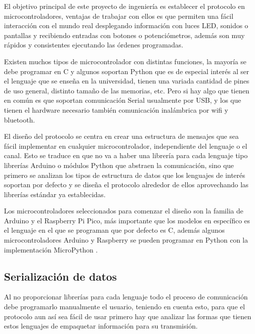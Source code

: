 El objetivo principal de este proyecto de ingeniería es establecer el protocolo en microcontroladores, ventajas de trabajar con ellos es que permiten una fácil interacción con el mundo real desplegando información con luces LED, sonidos o pantallas y recibiendo entradas con botones o potenciómetros, además son muy rápidos y consistentes ejecutando las órdenes programadas.

Existen muchos tipos de microcontrolador con distintas funciones, la mayoría se debe programar en C y algunos soportan Python que es de especial interés al ser el lenguaje que se enseña en la universidad, tienen una variada cantidad de pines de uso general, distinto tamaño de las memorias, etc. Pero si hay algo que tienen en común es que soportan comunicación Serial usualmente por USB, y los que tienen el hardware necesario también comunicación inalámbrica por wifi y bluetooth.

El diseño del protocolo se centra en crear una estructura de mensajes que sea fácil implementar en cualquier microcontrolador, independiente del lenguaje o el canal. Esto se traduce en que no va a haber una librería para cada lenguaje tipo librerías Arduino o módulos Python que abstraen la comunicación, sino que primero se analizan los tipos de estructura de datos que los lenguajes de interés soportan por defecto y se diseña el protocolo alrededor de ellos aprovechando las librerías estándar ya establecidas.

Los microcontroladores seleccionados para comenzar el diseño son la familia de Arduino y el Raspberry Pi Pico, más importante que los modelos en específico es el lenguaje en el que se programan que por defecto es C, además algunos microcontroladores Arduino y Raspberry se pueden programar en Python con la implementación MicroPython \cite{micropython}.

\subsection{Serialización de datos}

Al no proporcionar librerías para cada lenguaje todo el proceso de comunicación debe programarlo manualmente el usuario, teniendo en cuenta esto, para que el protocolo aun así sea fácil de usar primero hay que analizar las formas que tienen estos lenguajes de empaquetar información para su transmisión.

